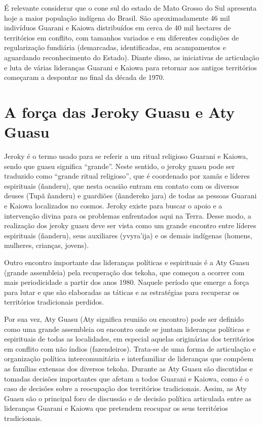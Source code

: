 É relevante considerar que o cone sul do estado de Mato Grosso do Sul
apresenta hoje a maior população indígena do Brasil. São
aproximadamente 46 mil indivíduos Guarani e Kaiowa distribuídos em
cerca de 40 mil hectares de territórios em conflito, com tamanhos
variados e em diferentes condições de regularização fundiária
(demarcadas, identificadas, em acampamentos e aguardando reconhecimento
do Estado). Diante disso, as iniciativas de articulação e luta de
várias lideranças Guarani e Kaiowa para retornar aos antigos
territórios começaram a despontar no final da década de 1970.

\section{A força das Jeroky Guasu e Aty Guasu}

Jeroky é o termo usado para se referir a um ritual religioso Guarani e
Kaiowa, sendo que guasu significa ``grande''. Neste sentido, o jeroky
guasu pode ser traduzido como ``grande ritual religioso'', que é
coordenado por xamãs e líderes espirituais (ñanderu), que nesta ocasião
entram em contato com os diversos deuses (Tupã ñanderu) e guardiões
(ñandereko jara) de todas as pessoas Guarani e Kaiowa localizados no
cosmos. Jeroky existe para buscar o apoio e a intervenção divina para
os problemas enfrentados aqui na Terra. Desse modo, a realização dos
jeroky guasu deve ser vista como um grande encontro entre líderes
espirituais (ñanderu), seus auxiliares (yvyra’ija) e os demais
indígenas (homens, mulheres, crianças, jovens). 

Outro encontro importante das lideranças políticas e espirituais é a Aty
Guasu (grande assembleia) pela recuperação dos tekoha, que começou a
ocorrer com mais periodicidade a partir dos anos 1980.  Naquele período
que emerge a força para lutar e que são elaboradas as táticas e as
estratégias para recuperar os territórios tradicionais perdidos.

Por sua vez, Aty Guasu (Aty significa reunião ou encontro) pode ser
definido como uma grande assembleia ou encontro onde se juntam
lideranças políticas e espirituais de todas as localidades, em especial
aquelas originárias dos territórios em conflito com não índios
(fazendeiros). Trata-se de uma forma de articulação e organização
política intercomunitária e interfamiliar de lideranças que compõem as
famílias extensas dos diversos tekoha. Durante as Aty Guasu são
discutidas e tomadas decisões importantes que afetam a todos Guarani e
Kaiowa, como é o caso de decisões sobre a reocupação dos territórios
tradicionais. Assim, as Aty Guasu são o principal foro de discussão e
de decisão política articulada entre as lideranças Guarani e Kaiowa que
pretendem reocupar os seus territórios tradicionais. 

